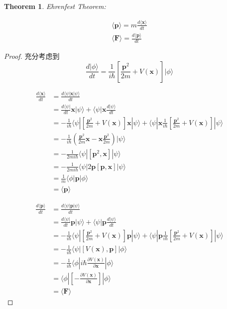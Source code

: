 \documentclass[12pt,a4paper,openany,twoside]{book}
\newtheorem{theorem}{Theorem}[section]
\numberwithin{equation}{section}
\newcommand{\bra}[1]{\langle #1 |}
\newcommand{\ket}[1]{| #1 \rangle}
\newcommand{\bracketl}[3]{\langle #1 | #2 | #3 \rangle}
\newcommand{\mean}[1]{\langle #1 \rangle}
\begin{document}
  \begin{theorem}
    Ehrenfest Theorem:
    
    \begin{align}
    \mean{\textbf{p}}= m \frac{d \mean{\textbf{x}}}{dt}\\
    \mean{\textbf{F}}= \frac{d\mean{\textbf{p}}}{dt}
    \end{align}
    \end{theorem}

  \begin{proof}
    充分考虑到
    \begin{equation}
    \frac{d\ket{\phi}}{dt}=\frac{1}{i\hbar}[\frac{\textbf{p}^2}{2m}+V(\textbf{x})]\ket{\phi}
    \end{equation}

    \begin{align*}
    \frac{d \mean{\textbf{x}}}{dt}  & = \frac{d \bracketl{\psi}{\textbf{x}}{\psi}}{dt} \\ 
    & = \frac{d\bra{\psi}}{dt} \textbf{x} \ket{\psi} + \bra{\psi} \textbf{x} \frac{d\ket{\psi}}{dt} \\
    &= - \frac{1}{i \hbar}\bra{\psi}[\frac{\textbf{p}^2}{2m}+V(\textbf{x})]\textbf{x}\ket{\psi}+ \bra{\psi}\textbf{x}\frac{1} {i\hbar}[\frac{\textbf{p}^2}{2m}+V(\textbf{x})]\ket{\psi}\\
    &= -\frac{1}{i\hbar}(\frac{\textbf{p}^2}{2m}\textbf{x}-\textbf{x}\frac{\textbf{p}^2}{2m})\ket{\psi}\\
    &= -\frac{1}{2mi\hbar}\bracketl{\psi}{[\textbf{p}^2,\textbf{x}]}{\psi}\\
    &=-\frac{1}{2mi\hbar}\bracketl{\psi}{2\textbf{p}[\textbf{p},\textbf{x}]}{\psi}\\
    &=\frac{1}{m}\bracketl{\phi}{\textbf{p}}{\phi}\\
    &=\mean{\textbf{p}}
    \end{align*}

    \begin{align*}
    \frac{d\mean{\textbf{p}}}{dt} &= \frac{d\bracketl{\psi}{\textbf{p}}{\psi}}{dt}\\
    &=\frac{d\bra{\psi}}{dt} \textbf{p} \ket{\psi} + \bra{\psi} \textbf{p} \frac{d\ket{\psi}}{dt} \\
    &= - \frac{1}{i \hbar}\bra{\psi}[\frac{\textbf{p}^2}{2m}+V(\textbf{x})]\textbf{p}\ket{\psi}+ \bra{\psi}\textbf{p}\frac{1} {i\hbar}[\frac{\textbf{p}^2}{2m}+V(\textbf{x})]\ket{\psi}\\
    &= -\frac{1}{i\hbar}\bracketl{\psi}{[V(\textbf{x}),\textbf{p}]}{\phi} \\
    & = -\frac{1}{i\hbar}\bracketl{\phi}{i\hbar\frac{\partial V(\textbf{x})}{\partial \textbf{x}}}{\phi}\\
    & = \bracketl{\phi}{[-\frac{\partial V(\textbf{x})}{\partial \textbf{x}}]}{\phi}\\
    & = \mean{\textbf{F}}
    \end{align*}


\end{proof}
\end{document}
